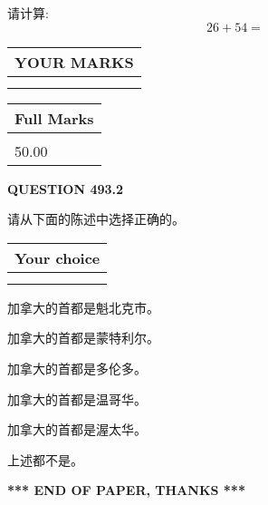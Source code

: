 \documentclass{ctexart}
\begin{document}
  
 
请计算:
\begin{equation}
26 +  %
54 = \nonumber
\end{equation}
 

 

 
  
\vspace{0.2in}
  
\noindent\begin{tabular}{|l|}
\hline
 YOUR MARKS  \\
\hline
 \\ 
 \\ 
\hline
\end{tabular}
\hspace{0.05in} \begin{tabular}{|l|}
\hline
 Full Marks  \\
\hline
 \\ 
50.00 \\
\hline
\end{tabular}
{\textbf{\Large{QUESTION
493.2 
}}}
  
  
请从下面的陈述中选择正确的。
  
  
\noindent\hspace{3.0in} \begin{tabular}{|l|}
\hline
Your choice \\
\hline
 \\ 
 \\ 
\hline
\end{tabular}
  
  
 
 
加拿大的首都是魁北克市。
 
 
加拿大的首都是蒙特利尔。
 
 
加拿大的首都是多伦多。
 
 
加拿大的首都是温哥华。
 
 
加拿大的首都是渥太华。
 
 
 上述都不是。
 
 
   
   
 \vspace{0.2in}
 
   
   
   
   
\vspace{1.0in} 
{\textbf{\large{ *** END OF PAPER, THANKS *** }}} 
   
\end{document}
